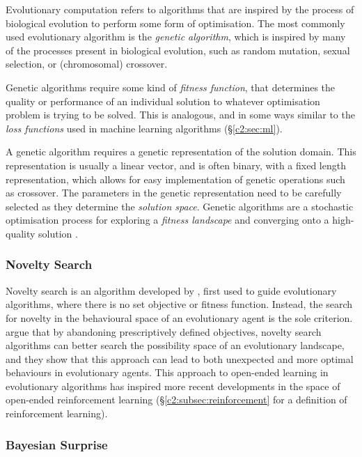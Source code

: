 Evolutionary computation refers to algorithms that are inspired by the process of biological evolution to perform some form of optimisation. 
The most commonly used evolutionary algorithm is the \textit{genetic algorithm}, which is inspired by many of the processes present in biological evolution, such as random mutation, sexual selection, or (chromosomal) crossover.

Genetic algorithms require some kind of \textit{fitness function}, that determines the quality or performance of an individual solution to whatever optimisation problem is trying to be solved. 
This is analogous, and in some ways similar to the \textit{loss functions} used in machine learning algorithms (\S \ref{c2:sec:ml}). 

A genetic algorithm requires a genetic representation of the solution domain. 
This representation is usually a linear vector, and is often binary, with a fixed length representation, which allows for easy implementation of genetic operations such as crossover. 
The parameters in the genetic representation need to be carefully selected as they determine the \textit{solution space}.
Genetic algorithms are a stochastic optimisation process for exploring a \textit{fitness landscape} and converging onto a high-quality solution \citep{back1996evolutionary}.

\subsubsection{Novelty Search}

Novelty search is an algorithm developed by \cite{lehman2008exploiting}, first used to guide evolutionary algorithms, where there is no set objective or fitness function.
Instead, the search for novelty in the behavioural space of an evolutionary agent is the sole criterion. \cite{lehman2010efficiently, lehman2011abandoning,lehman2011novelty} argue that by abandoning prescriptively defined objectives, novelty search algorithms can better search the possibility space of an evolutionary landscape, and they show that this approach can lead to both unexpected and more optimal behaviours in evolutionary agents.
This approach to open-ended learning in evolutionary algorithms has inspired more recent developments in the space of open-ended reinforcement learning \citep{wang2020enhanced} (\S \ref{c2:subsec:reinforcement} for a definition of reinforcement learning).

\subsubsection{Bayesian Surprise}

